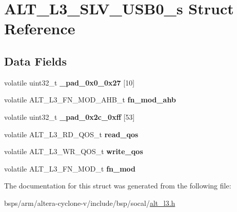 \hypertarget{structALT__L3__SLV__USB0__s}{}\section{A\+L\+T\+\_\+\+L3\+\_\+\+S\+L\+V\+\_\+\+U\+S\+B0\+\_\+s Struct Reference}
\label{structALT__L3__SLV__USB0__s}
\subsection*{Data Fields}
\begin{DoxyCompactItemize}
\item 
\mbox{\label{structALT__L3__SLV__USB0__s_adf3c02d5425202399cd10b782f8d872c}} 
volatile uint32\+\_\+t {\bfseries \+\_\+pad\+\_\+0x0\+\_\+0x27} \mbox{[}10\mbox{]}
\item 
\mbox{\label{structALT__L3__SLV__USB0__s_a6c741cf5cafb4021041838b8ca66959c}} 
volatile A\+L\+T\+\_\+\+L3\+\_\+\+F\+N\+\_\+\+M\+O\+D\+\_\+\+A\+H\+B\+\_\+t {\bfseries fn\+\_\+mod\+\_\+ahb}
\item 
\mbox{\label{structALT__L3__SLV__USB0__s_a45d5a57b341b880c248c053b830926bf}} 
volatile uint32\+\_\+t {\bfseries \+\_\+pad\+\_\+0x2c\+\_\+0xff} \mbox{[}53\mbox{]}
\item 
\mbox{\label{structALT__L3__SLV__USB0__s_a620ed9b39bbd648639961c5eb33e3087}} 
volatile A\+L\+T\+\_\+\+L3\+\_\+\+R\+D\+\_\+\+Q\+O\+S\+\_\+t {\bfseries read\+\_\+qos}
\item 
\mbox{\label{structALT__L3__SLV__USB0__s_ad5547a73b57b244c575ea35b68391278}} 
volatile A\+L\+T\+\_\+\+L3\+\_\+\+W\+R\+\_\+\+Q\+O\+S\+\_\+t {\bfseries write\+\_\+qos}
\item 
\mbox{\label{structALT__L3__SLV__USB0__s_aeff99195e0735c981d46b3dc30251233}} 
volatile A\+L\+T\+\_\+\+L3\+\_\+\+F\+N\+\_\+\+M\+O\+D\+\_\+t {\bfseries fn\+\_\+mod}
\end{DoxyCompactItemize}


The documentation for this struct was generated from the following file\+:\begin{DoxyCompactItemize}
\item 
bsps/arm/altera-\/cyclone-\/v/include/bsp/socal/\mbox{\hyperlink{alt__l3_8h}{alt\+\_\+l3.\+h}}\end{DoxyCompactItemize}
